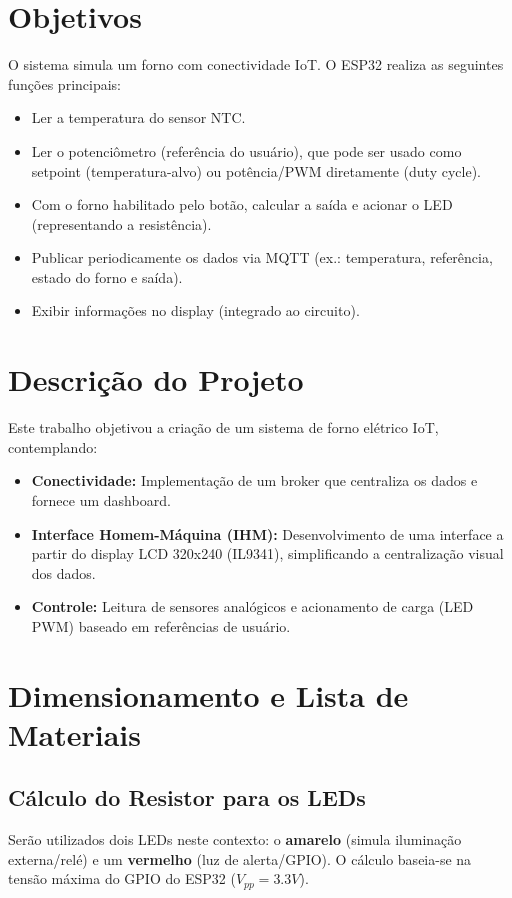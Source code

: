 \documentclass[12pt,a4paper]{article}
\begin{document}
	\tableofcontents
	\newpage
	
	
	\section{Objetivos}
	
	O sistema simula um forno com conectividade IoT. O ESP32 realiza as seguintes funções principais:
	\begin{itemize}
		\item Ler a temperatura do sensor NTC.
		\item Ler o potenciômetro (referência do usuário), que pode ser usado como setpoint (temperatura-alvo) ou potência/PWM diretamente (duty cycle).
		\item Com o forno habilitado pelo botão, calcular a saída e acionar o LED (representando a resistência).
		\item Publicar periodicamente os dados via MQTT (ex.: temperatura, referência, estado do forno e saída).
		\item Exibir informações no display (integrado ao circuito).
	\end{itemize}
	
	\section{Descrição do Projeto}
	
	Este trabalho objetivou a criação de um sistema de forno elétrico IoT, contemplando:
	\begin{itemize}
		\item \textbf{Conectividade:} Implementação de um broker que centraliza os dados e fornece um dashboard.
		\item \textbf{Interface Homem-Máquina (IHM):} Desenvolvimento de uma interface a partir do display LCD 320x240 (IL9341), simplificando a centralização visual dos dados.
		\item \textbf{Controle:} Leitura de sensores analógicos e acionamento de carga (LED PWM) baseado em referências de usuário.
	\end{itemize}
	
	\section{Dimensionamento e Lista de Materiais}
	
	\subsection{Cálculo do Resistor para os LEDs}
	Serão utilizados dois LEDs neste contexto: o \textbf{amarelo} (simula iluminação externa/relé) e um \textbf{vermelho} (luz de alerta/GPIO).
	O cálculo baseia-se na tensão máxima do GPIO do ESP32 ($V_{pp} = 3.3V$).
	
\end{document}
